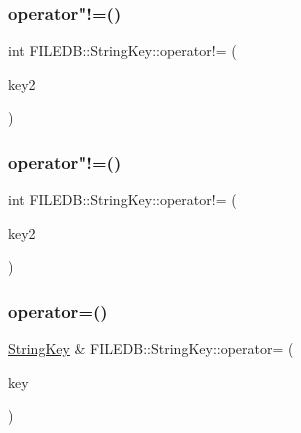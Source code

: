 \mbox{\label{classFILEDB_1_1StringKey_ad7c210e36fa7438742afa4ed3c66a3df}} 
\subsubsection{\texorpdfstring{operator"!=()}{operator!=()}\hspace{0.1cm}{\footnotesize\ttfamily [2/3]}}
{\footnotesize\ttfamily int F\+I\+L\+E\+D\+B\+::\+String\+Key\+::operator!= (\begin{DoxyParamCaption}\item[{const \mbox{\hyperlink{classFILEDB_1_1StringKey}{String\+Key}} \&}]{key2 }\end{DoxyParamCaption})}

\mbox{\label{classFILEDB_1_1StringKey_ad7c210e36fa7438742afa4ed3c66a3df}} 
\subsubsection{\texorpdfstring{operator"!=()}{operator!=()}\hspace{0.1cm}{\footnotesize\ttfamily [3/3]}}
{\footnotesize\ttfamily int F\+I\+L\+E\+D\+B\+::\+String\+Key\+::operator!= (\begin{DoxyParamCaption}\item[{const \mbox{\hyperlink{classFILEDB_1_1StringKey}{String\+Key}} \&}]{key2 }\end{DoxyParamCaption})}

\mbox{\label{classFILEDB_1_1StringKey_a2081a1d6473a3139ecdd642dcc2874ba}} 
\subsubsection{\texorpdfstring{operator=()}{operator=()}\hspace{0.1cm}{\footnotesize\ttfamily [1/6]}}
{\footnotesize\ttfamily \mbox{\hyperlink{classFILEDB_1_1StringKey}{String\+Key}} \& F\+I\+L\+E\+D\+B\+::\+String\+Key\+::operator= (\begin{DoxyParamCaption}\item[{const \mbox{\hyperlink{classFILEDB_1_1StringKey}{String\+Key}} \&}]{key }\end{DoxyParamCaption})}

